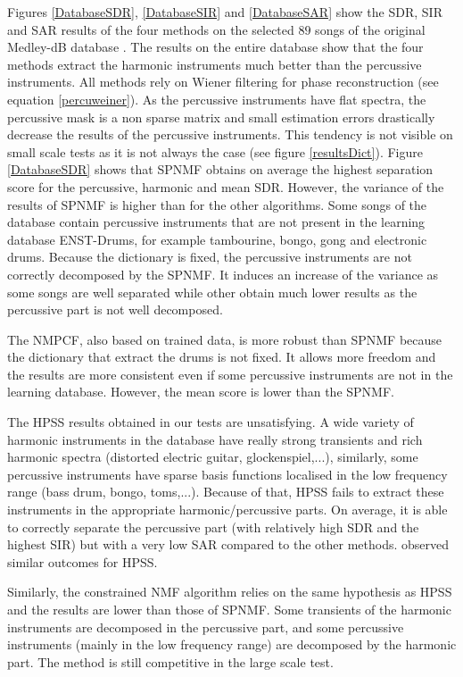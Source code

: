 \documentclass[journal]{IEEEtran}
\begin{document}
Figures \ref{DatabaseSDR}, \ref{DatabaseSIR} and \ref{DatabaseSAR} show the SDR, SIR and SAR results of the four methods on the selected $89$ songs of the original Medley-dB database \cite{bittner2014medleydb}. The results on the entire database show that the four methods extract the harmonic instruments much better than the percussive instruments. All methods rely on Wiener filtering for phase reconstruction (see equation \ref{percuweiner}). As the percussive instruments have flat spectra, the percussive mask is a non sparse matrix and small estimation errors drastically decrease the results of the percussive instruments. This tendency is not visible on small scale tests as it is not always the case (see figure \ref{resultsDict}). 
Figure \ref{DatabaseSDR} shows that SPNMF obtains on average the highest separation score for the percussive, harmonic and mean SDR. However, the variance of the results of SPNMF is higher than for the other algorithms. Some songs of the database contain percussive instruments that are not present in the learning database ENST-Drums, for example tambourine, bongo, gong and electronic drums. Because the dictionary is fixed, the percussive instruments are not correctly decomposed by the SPNMF. It induces an increase of the variance as some songs are well separated while other obtain much lower results as the percussive part is not well decomposed.

The NMPCF, also based on trained data, is more robust than SPNMF because the dictionary that extract the drums is not fixed. It allows more freedom and the results are more consistent even if some percussive instruments are not in the learning database. However, the mean score is lower than the SPNMF.

The HPSS results obtained in our tests are unsatisfying. A wide variety of harmonic instruments in the database have really strong transients and rich harmonic spectra (distorted electric guitar, glockenspiel,...), similarly, some percussive instruments have sparse basis functions localised in the low frequency range (bass drum, bongo, toms,...). Because of that, HPSS fails to extract these instruments in the appropriate harmonic/percussive parts. On average, it is able to correctly separate the percussive part (with relatively high SDR and the highest SIR) but with a very low SAR compared to the other methods. \cite{canadas2014percussive} observed similar outcomes for HPSS.

Similarly, the constrained NMF algorithm relies on the same hypothesis as HPSS and the results are lower than those of SPNMF. Some transients of the harmonic instruments are decomposed in the percussive part, and some percussive instruments (mainly in the low frequency range) are decomposed by the harmonic part. The method is still competitive in the large scale test. 
\end{document}
